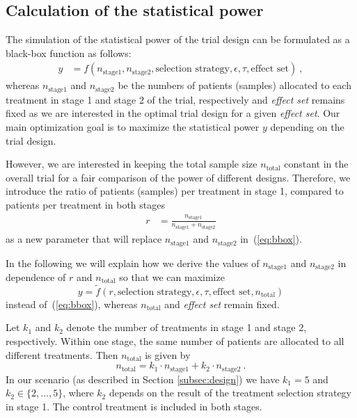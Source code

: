 \documentclass[bimj,fleqn]{w-art}
\theoremstyle{plain}
\theoremstyle{definition}
\begin{document}
\subsection{Calculation of the statistical power}

The simulation of the statistical power of the trial design can be formulated as a black-box function as follows:
\begin{align}
  \label{eq:bbox}
  y & = f(n_{\text{stage1}}, n_{\text{stage2}}, \text{selection strategy}, \epsilon, \tau, \text{effect set}) \ ,
\end{align}
whereas $n_{\text{stage1}}$ and $n_{\text{stage2}}$ be the numbers of patients (samples) allocated to each treatment in stage 1 and stage 2 of the trial, respectively and \emph{effect set} remains fixed as we are interested in the optimal trial design for a given \emph{effect set}.
Our main optimization goal is to maximize the statistical power $y$ depending on the trial design. 

However, we are interested in keeping the total sample size $n_{\text{total}}$ constant in the overall trial for a fair comparison of the power of different designs.
Therefore, we introduce the ratio of patients (samples) per treatment in stage 1, compared to patients per treatment in both stages
\begin{align}
  \label{eq:r}
 r & = \frac{n_{\text{stage1}}}{n_{\text{stage1}}+n_{\text{stage2}}}
\end{align}
as a new parameter that will replace $n_{\text{stage1}}$ and $n_{\text{stage2}}$ in~(\ref{eq:bbox}). 

In the following we will explain how we derive the values of $n_{\text{stage1}}$ and $n_{\text{stage2}}$ in dependence of $r$ and $n_{\text{total}}$ so that we can maximize
\begin{equation}
  \label{eq:bbox2}
  y = \tilde{f}(r, \text{selection strategy}, \epsilon, \tau, \text{effect set}, n_{\text{total}})
\end{equation}
instead of~(\ref{eq:bbox}), whereas $n_{\text{total}}$ and \emph{effect set} remain fixed.

Let $k_1$ and $k_2$ denote the number of treatments in stage 1 and stage 2, respectively. 
Within one stage, the same number of patients are allocated to all different treatments. 
Then $n_{\text{total}}$ is given by
\begin{equation}
  \label{eq:ntreat}
  n_{\text{total}} = k_1 \cdot n_{\text{stage1}} + k_2 \cdot n_{\text{stage2}} \ .
\end{equation}
In our scenario (as described in Section \ref{subsec:design}) we have $k_1 = 5$ and $k_2 \in \{2, \ldots, 5\}$, where $k_2$ depends on the result of the treatment selection strategy in stage 1.
The control treatment is included in both stages.
\end{document}
